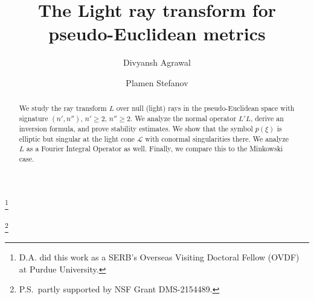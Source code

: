 \documentclass[11pt]{amsart}
\theoremstyle{definition}
\theoremstyle{remark}
\numberwithin{equation}{section}
\begin{document}
\title{The Light ray transform for pseudo-Euclidean metrics}

\author{Divyansh Agrawal}
\address{Centre for Applicable Mathematics, Tata Institute of Fundamental Research, Bangalore, India and Department of Mathematics, Purdue University, West Lafayette, IN 47907}

\thanks{D.A. did this work as a SERB's Overseas Visiting Doctoral Fellow (OVDF) at Purdue University.}


\author{Plamen Stefanov}

\address{Department of Mathematics, Purdue University, West Lafayette, IN 47907}
\thanks{P.S.~partly supported by  NSF  Grant DMS-2154489.}

\date{}

\dedicatory{}


\begin{abstract}
	We study the ray transform $L$ over null (light) rays in the  pseudo-Euclidean space with signature $(n',n'')$, $n'\ge2$, $n''\ge2$. We analyze the normal operator $L'L$, derive an inversion formula, and prove stability estimates. We show that the symbol $p(\xi)$ is elliptic but singular at the light cone $\mathcal L$ with conormal singularities there.  We analyze  $L$ as a Fourier Integral Operator as well. Finally, we compare this to the Minkowski case.
\end{abstract}

\maketitle
\end{document}

